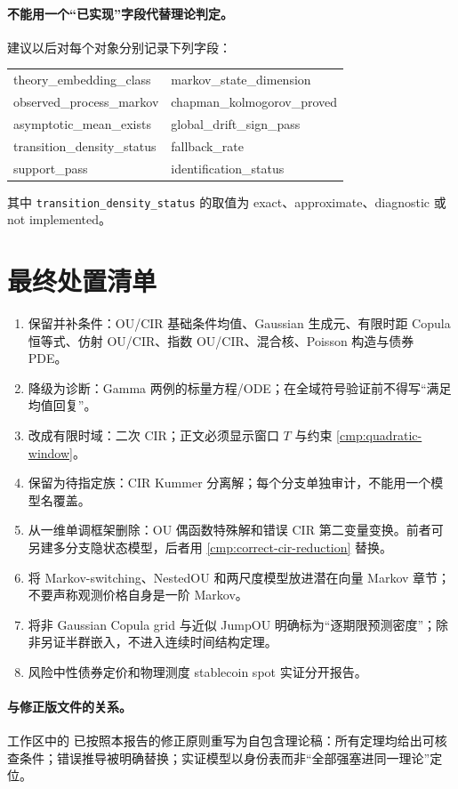 \documentclass[UTF8,11pt]{ctexart}
\begin{document}
\paragraph{不能用一个“已实现”字段代替理论判定。}
建议以后对每个对象分别记录下列字段：
\begin{center}
\small\ttfamily
\begin{tabular}{@{}ll@{}}
theory\_embedding\_class & markov\_state\_dimension\\
observed\_process\_markov & chapman\_kolmogorov\_proved\\
asymptotic\_mean\_exists & global\_drift\_sign\_pass\\
transition\_density\_status & fallback\_rate\\
support\_pass & identification\_status
\end{tabular}
\end{center}
其中 \texttt{transition\_density\_status} 的取值为
exact、approximate、diagnostic 或 not implemented。

\section{最终处置清单}

\begin{enumerate}[label=\arabic*.]
  \item 保留并补条件：OU/CIR 基础条件均值、Gaussian 生成元、有限时距 Copula 恒等式、仿射 OU/CIR、指数 OU/CIR、混合核、Poisson 构造与债券 PDE。
  \item 降级为诊断：Gamma 两例的标量方程/ODE；在全域符号验证前不得写“满足均值回复”。
  \item 改成有限时域：二次 CIR；正文必须显示窗口 $T$ 与约束 \eqref{cmp:quadratic-window}。
  \item 保留为待指定族：CIR Kummer 分离解；每个分支单独审计，不能用一个模型名覆盖。
  \item 从一维单调框架删除：OU 偶函数特殊解和错误 CIR 第二变量变换。前者可另建多分支隐状态模型，后者用 \eqref{cmp:correct-cir-reduction} 替换。
  \item 将 Markov-switching、NestedOU 和两尺度模型放进潜在向量 Markov 章节；不要声称观测价格自身是一阶 Markov。
  \item 将非 Gaussian Copula grid 与近似 JumpOU 明确标为“逐期限预测密度”；除非另证半群嵌入，不进入连续时间结构定理。
  \item 风险中性债券定价和物理测度 stablecoin spot 实证分开报告。
\end{enumerate}

\paragraph{与修正版文件的关系。}
工作区中的  已按照本报告的修正原则重写为自包含理论稿：所有定理均给出可核查条件；错误推导被明确替换；实证模型以身份表而非“全部强塞进同一理论”定位。
\end{document}
